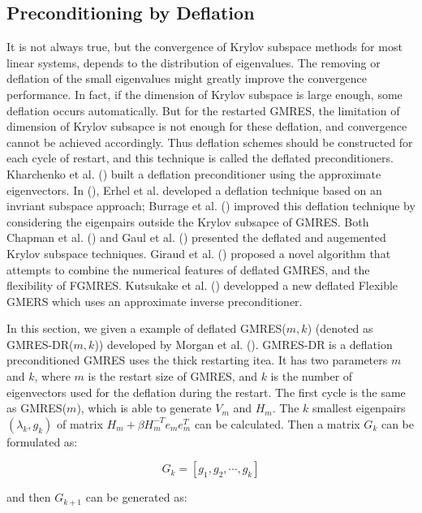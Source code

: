 \subsection{Preconditioning by Deflation}

It is not always true, but the convergence of Krylov subspace methods for most linear systems, depends to the distribution of eigenvalues. The removing or deflation of the small eigenvalues might greatly improve the convergence performance. In fact, if the dimension of Krylov subspace is large enough, some deflation occurs automatically. But for the restarted GMRES, the limitation of dimension of Krylov subsapce is not enough for these deflation, and convergence cannot be achieved accordingly. Thus deflation schemes should be constructed for each cycle of restart, and this technique is called the deflated preconditioners. Kharchenko et al. (\cite{kharchenko1995eigenvalue}) built a deflation preconditioner using the approximate eigenvectors. In (\cite{erhel1996restarted}), Erhel et al. developed a deflation technique based on an invriant subspace approach; Burrage et al.  (\cite{burrage1998deflation}) improved this deflation technique by considering the eigenpairs outside the Krylov subsapce of GMRES. Both Chapman et al. (\cite{chapman1997deflated}) and Gaul et al. (\cite{gaul2013framework}) presented the deflated and augemented Krylov subspace techniques. Giraud et al. (\cite{giraud2010flexible}) proposed a novel algorithm that attempts to combine the numerical features of deflated GMRES, and the flexibility of FGMRES. Kutsukake et al. (\cite{kutsukake2015deflated}) developped a new deflated Flexible GMERS which uses an approximate inverse preconditioner. 

In this section, we given a example of deflated GMRES($m,k$) (denoted as GMRES-DR($m,k$)) developed by Morgan et al. (\cite{morgan2002gmres}). GMRES-DR is a deflation preconditioned GMRES uses the thick restarting itea. It has two parameters $m$ and $k$, where $m$ is the restart size of GMRES, and $k$ is the number of eigenvectors used for the deflation during the restart. The first cycle is the same as GMRES($m$), which is able to generate $V_m$ and $H_m$. The $k$ smallest eigenpairs $(\lambda_k, g_k)$ of matrix $H_m+\beta H_m^{-T}e_me_m^T$ can be calculated. Then a matrix $G_k$ can be formulated as:

\begin{equation}
	 G_k=[g_1,g_2,\cdots,g_k]
\end{equation}

and then $G_{k+1}$ can be generated as:

